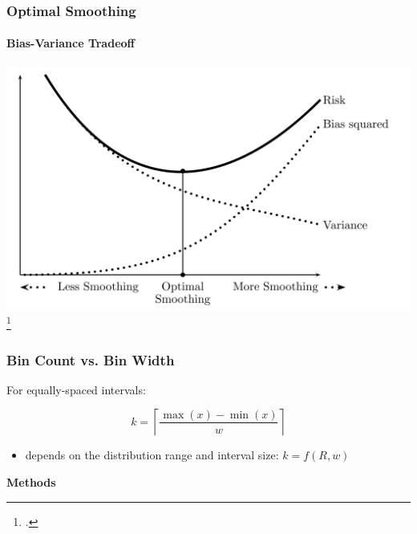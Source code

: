 \documentclass[mathserif]{beamer}
\begin{document}
    \begin{frame}
        \frametitle{Optimal Smoothing}
        \framesubtitle{Bias-Variance Tradeoff}

        \includegraphics[width=1\columnwidth]{res/bias-variance-smoothing.png}\let\thefootnote\relax\footcite{Wasserman2004}
    \end{frame}


    \begin{frame}
        \frametitle{Bin Count vs. Bin Width}

        For equally-spaced intervals:

        \begin{equation}
            \label{eq:ordinary_count_width}
            k=\left\lceil\frac{\max(x)-\min (x)}{w}\right\rceil
        \end{equation}

        \begin{itemize}
            \item depends on the distribution range and interval size: $k = f(R, w)$

        \end{itemize}
    \end{frame}

    \begin{frame}
        \Huge \textbf{Methods}
    \end{frame}
\end{document}
